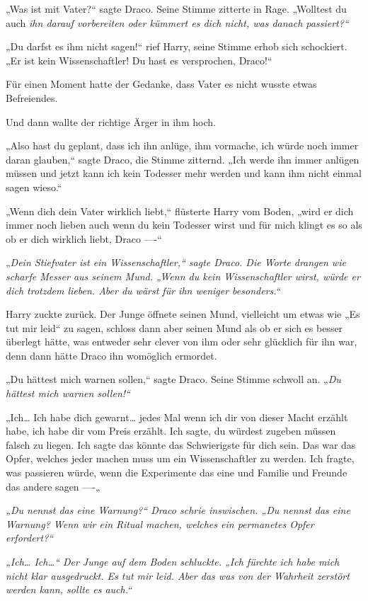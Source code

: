 {„Was ist mit Vater?“ sagte Draco. Seine Stimme zitterte in Rage. „Wolltest du auch \emph{ihn darauf vorbereiten oder kümmert es dich nicht, was danach passiert?“}

„Du darfst es ihm nicht sagen!“ rief Harry, seine Stimme erhob sich schockiert. „Er ist kein Wissenschaftler! Du hast es versprochen, Draco!“

Für einen Moment hatte der Gedanke, dass Vater es nicht wusste etwas Befreiendes.

Und dann wallte der richtige Ärger in ihm hoch.

„Also hast du geplant, dass ich ihn anlüge, ihm vormache, ich würde noch immer daran glauben,“ sagte Draco, die Stimme zitternd. „Ich werde ihn immer anlügen müssen und jetzt kann ich kein Todesser mehr werden und kann ihm nicht einmal sagen wieso.“

„Wenn dich dein Vater wirklich liebt,“ flüsterte Harry vom Boden, „wird er dich immer noch lieben auch wenn du kein Todesser wirst und für mich klingt es so als ob er dich wirklich liebt, Draco ----“

„\emph{Dein Stiefvater ist ein Wissenschaftler,“ sagte Draco. Die Worte drangen wie scharfe Messer aus seinem Mund. „Wenn \emph{du} kein Wissenschaftler wirst, würde er dich trotzdem lieben. Aber du wärst für ihn weniger besonders.“}

Harry zuckte zurück. Der Junge öffnete seinen Mund, vielleicht um etwas wie „Es tut mir leid“ zu sagen, schloss dann aber seinen Mund als ob er sich es besser überlegt hätte, was entweder sehr clever von ihm oder sehr glücklich für ihn war, denn dann hätte Draco ihn womöglich ermordet.

„Du hättest mich warnen sollen,“ sagte Draco. Seine Stimme schwoll an. „\emph{Du hättest mich warnen sollen!“}

„Ich… Ich habe dich gewarnt… jedes Mal wenn ich dir von dieser Macht erzählt habe, ich habe dir vom Preis erzählt. Ich sagte, du würdest zugeben müssen falsch zu liegen. Ich sagte das könnte das Schwierigste für dich sein. Das war das Opfer, welches jeder machen muss um ein Wissenschaftler zu werden. Ich fragte, was passieren würde, wenn die Experimente das eine und Familie und Freunde das andere sagen ----„

\emph{„\emph{Du nennst das eine Warnung?“} Draco schrie inswischen. \emph{„Du nennst das eine Warnung? Wenn wir ein Ritual machen, welches ein permanetes Opfer erfordert?“}}

\emph{„Ich… Ich…“ Der Junge auf dem Boden schluckte. „Ich fürchte ich habe mich nicht klar ausgedruckt. Es tut mir leid. Aber das was von der Wahrheit zerstört werden kann, sollte es auch.“}

}
